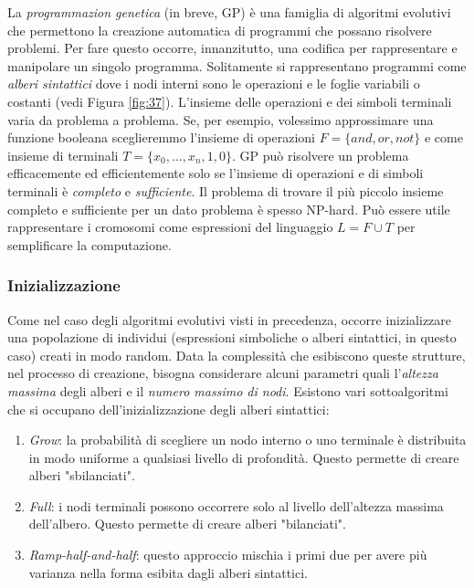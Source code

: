 \documentclass[10pt,a4paper]{article}
\begin{document}
La \emph{programmazion genetica} (in breve, GP) è una famiglia di algoritmi evolutivi che permettono la creazione automatica di programmi che possano risolvere problemi. Per fare questo occorre, innanzitutto, una codifica per rappresentare e manipolare un singolo programma. Solitamente si rappresentano programmi come \emph{alberi sintattici} dove i nodi interni sono le operazioni e le foglie variabili o costanti (vedi Figura \ref{fig:37}). L'insieme delle operazioni e dei simboli terminali varia da problema a problema. Se, per esempio, volessimo approssimare una funzione booleana sceglieremmo l'insieme di operazioni $F = \{and, or, not\}$ e come insieme di terminali $T = \{ x_0, \dots, x_n, 1, 0 \}$. GP può risolvere un problema efficacemente ed efficientemente solo se l'insieme di operazioni e di simboli terminali è \emph{completo} e \emph{sufficiente}. Il problema di trovare il più piccolo insieme completo e sufficiente per un dato problema è spesso NP-hard. Può essere utile rappresentare i cromosomi come espressioni del linguaggio $L = F \cup T$ per semplificare la computazione. 

\subsubsection{Inizializzazione}

Come nel caso degli algoritmi evolutivi visti in precedenza, occorre inizializzare una popolazione di individui (espressioni simboliche o alberi sintattici, in questo caso) creati in modo random. Data la complessità che esibiscono queste strutture, nel processo di creazione, bisogna considerare alcuni parametri quali l'\emph{altezza massima} degli alberi e il \emph{numero massimo di nodi}. Esistono vari sottoalgoritmi che si occupano dell'inizializzazione degli alberi sintattici:

\begin{enumerate}
\item{\emph{Grow}: la probabilità di scegliere un nodo interno o uno terminale è distribuita in modo uniforme a qualsiasi livello di profondità. Questo permette di creare alberi "sbilanciati".}
\item{\emph{Full}: i nodi terminali possono occorrere solo al livello dell'altezza massima dell'albero. Questo permette di creare alberi "bilanciati".}
\item{\emph{Ramp-half-and-half}: questo approccio mischia i primi due per avere più varianza nella forma esibita dagli alberi sintattici.}
\end{enumerate}
\end{document}
